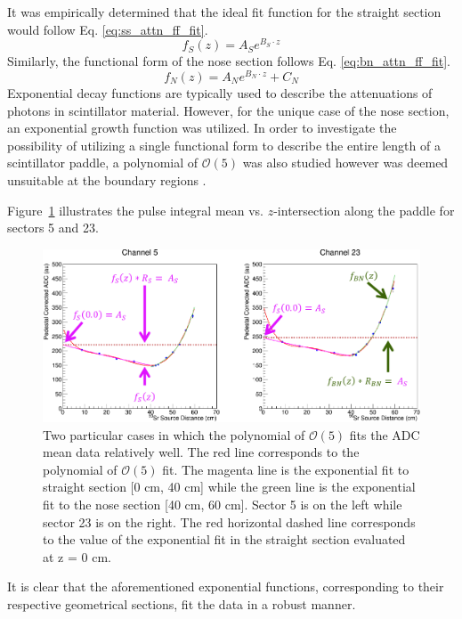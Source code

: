 It was empirically determined that the ideal fit function for the straight section would follow Eq. \ref{eq:ss_attn_ff_fit}.
	\begin{equation} \label{eq:ss_attn_ff_fit}
		f_{S}(z) = A_{S}e^{B_{S} \cdot z}
	\end{equation}
Similarly, the functional form of the nose section follows Eq. \ref{eq:bn_attn_ff_fit}.
	\begin{equation} \label{eq:bn_attn_ff_fit}
		f_{N}(z) = A_{N}e^{B_{N} \cdot z} + C_{N}
	\end{equation}
Exponential decay functions are typically used to describe the attenuations of photons in scintillator material.  However, for the unique case of the nose section, an exponential growth function was utilized.  In order to investigate the possibility of utilizing a single functional form to describe the entire length of a scintillator paddle, a polynomial of $\mathcal{O}(5)$ was also studied however was deemed unsuitable at the boundary regions \cite{pooser16}.

Figure~\ref{fig:attfits} illustrates the pulse integral mean vs. $z$-intersection along the paddle for sectors 5 and 23.  
\begin{figure}[!htb]
	\centering
	\includegraphics[width=1.0\columnwidth]{calibration/figs/attn_fits}
	\caption{Two particular cases in which the polynomial of $\mathcal{O}(5)$ fits the ADC mean data relatively well.  The red line corresponds to the polynomial of $\mathcal{O}(5)$ fit.  The magenta line is the exponential fit to straight section [0 cm, 40 cm] while the green line is the exponential fit to the nose section [40 cm, 60 cm].  Sector 5 is on the left while sector 23 is on the right.  The red horizontal dashed line corresponds to the value of the exponential fit in the straight section evaluated at z = 0 cm.}
	\label{fig:attfits}
\end{figure}
It is clear that the aforementioned exponential functions, corresponding to their respective geometrical sections, fit the data in a robust manner. 

